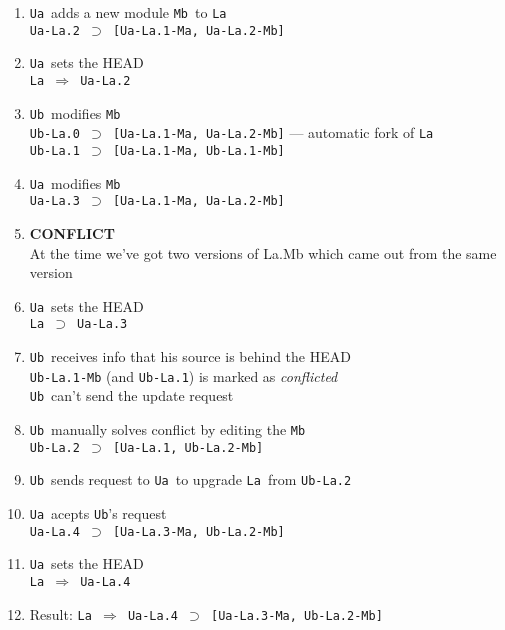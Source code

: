 \documentclass[10pt]{article}
\def\Ua{{\tt Ua}}
\def\Ub{{\tt Ub}}
\def\La{{\tt La}}
\def\Mb{{\tt Mb}}
\def\headsto{${\Longrightarrow}$ }
\def\hto{\headsto}
\def\eq{${\supset}$ }
\begin{document}
		\begin{enumerate}
			\item{\Ua\ adds a new module \Mb\ to \La\\
            		{\tt Ua-La.2 \eq [Ua-La.1-Ma, Ua-La.2-Mb]}
			}
			\item{\Ua\ sets the HEAD\\
				{\tt La \hto Ua-La.2}
			}
			\item{\Ub\ modifies \Mb\\
				{\tt Ub-La.0 \eq [Ua-La.1-Ma, Ua-La.2-Mb]} --- automatic fork of \La\\
				{\tt Ub-La.1 \eq [Ua-La.1-Ma, Ub-La.1-Mb]}
			}
			\item{\Ua\ modifies \Mb\\
				{\tt Ua-La.3 \eq [Ua-La.1-Ma, Ua-La.2-Mb]}
			}
			\item{{\bf CONFLICT}\\
            		At the time we've got two versions of La.Mb which came out from the same version
            	}
            	\item{\Ua\ sets the HEAD\\
            		{\tt La \eq Ua-La.3}
            	}
            	\item{\Ub\ receives info that his source is behind the HEAD\\
				{\tt Ub-La.1-Mb} (and {\tt Ub-La.1}) is marked as {\em conflicted}\\
				\Ub\ can't send the update request
			}
			\item{\Ub\ manually solves conflict by editing the \Mb\\
				{\tt Ub-La.2 \eq [Ua-La.1, Ub-La.2-Mb]}
			}
			\item{\Ub\ sends request to \Ua\ to upgrade \La\ from {\tt Ub-La.2}}
			\item{\Ua\ acepts \Ub's request\\
				{\tt Ua-La.4 \eq [Ua-La.3-Ma, Ub-La.2-Mb]}
			}
			\item{\Ua\ sets the HEAD\\
				{\tt La \hto Ua-La.4}
			}
			\item{Result: {\tt La \hto Ua-La.4 \eq [Ua-La.3-Ma, Ub-La.2-Mb]}}
		\end{enumerate}
		
\end{document}
